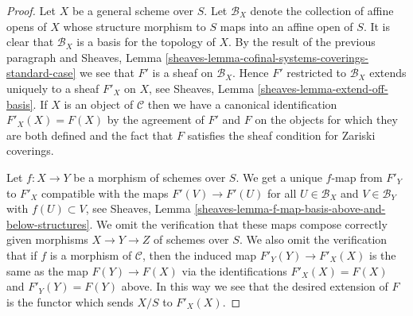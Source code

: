 \documentclass{stacks-project}
\theoremstyle{plain}
\theoremstyle{definition}
\theoremstyle{remark}
\numberwithin{equation}{subsection}
\begin{document}
\begin{proof}
\medskip\noindent
Let $X$ be a general scheme over $S$. Let $\mathcal{B}_X$ denote
the collection of affine opens of $X$ whose structure morphism
to $S$ maps into an affine open of $S$. It is clear that
$\mathcal{B}_X$ is a basis for the topology of $X$.
By the result of the previous paragraph and Sheaves, Lemma
\ref{sheaves-lemma-cofinal-systems-coverings-standard-case}
we see that $F'$ is a sheaf on $\mathcal{B}_X$.
Hence $F'$ restricted to $\mathcal{B}_X$
extends uniquely to a sheaf $F'_X$ on $X$, see
Sheaves, Lemma \ref{sheaves-lemma-extend-off-basis}.
If $X$ is an object of $\mathcal{C}$ then we have a canonical
identification $F'_X(X) = F(X)$ by the agreement of $F'$ and $F$
on the objects for which they are both defined and
the fact that $F$ satisfies the sheaf condition for
Zariski coverings.

\medskip\noindent
Let $f : X \to Y$ be a morphism of schemes over $S$.
We get a unique $f$-map from $F'_Y$ to $F'_X$ compatible
with the maps $F'(V) \to F'(U)$ for all
$U \in \mathcal{B}_X$ and $V \in \mathcal{B}_Y$
with $f(U) \subset V$, see
Sheaves, Lemma \ref{sheaves-lemma-f-map-basis-above-and-below-structures}.
We omit the verification that these maps compose
correctly given morphisms $X \to Y \to Z$ of schemes over $S$.
We also omit the verification that if $f$ is a morphism
of $\mathcal{C}$, then the induced map $F'_Y(Y) \to F'_X(X)$
is the same as the map $F(Y) \to F(X)$ via the identifications
$F'_X(X) = F(X)$ and $F'_Y(Y) = F(Y)$ above.
In this way we see that the desired extension of
$F$ is the functor which sends $X/S$ to $F'_X(X)$.


\end{proof}
\end{document}

